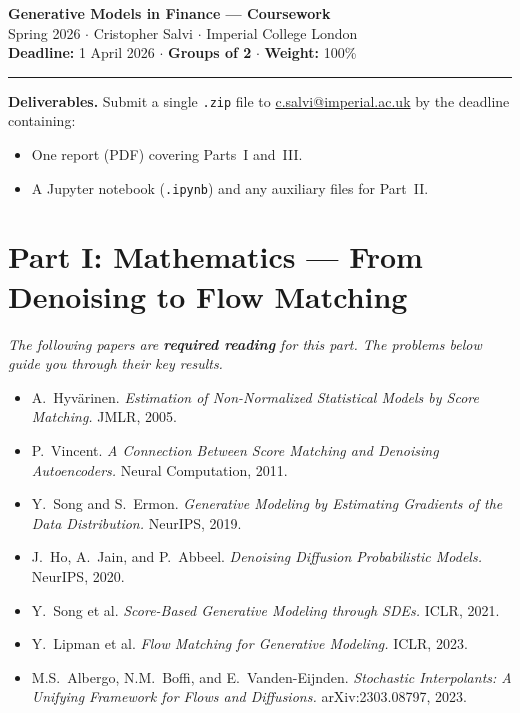 \documentclass[11pt]{article}
\theoremstyle{definition}
\theoremstyle{remark}
\begin{document}
\begin{center}
{\Large \textbf{Generative Models in Finance --- Coursework}} \\[0.3em]
{\normalsize Spring 2026 \quad $\cdot$ \quad Cristopher Salvi \quad $\cdot$ \quad Imperial College London} \\[0.3em]
{\normalsize \textbf{Deadline:} 1 April 2026 \quad $\cdot$ \quad \textbf{Groups of 2} \quad $\cdot$ \quad \textbf{Weight:} 100\%}
\end{center}

\vspace{-0.3em}
\hrule
\vspace{0.6em}

\textbf{Deliverables.} Submit a single \texttt{.zip} file to \href{mailto:c.salvi@imperial.ac.uk}{c.salvi@imperial.ac.uk} by the deadline containing:
\begin{itemize}
\item One report (PDF) covering Parts~I and~III.
\item A Jupyter notebook (\texttt{.ipynb}) and any auxiliary files for Part~II.
\end{itemize}

\section*{Part I: Mathematics --- From Denoising to Flow Matching}

\textit{The following papers are \textbf{required reading} for this part. The problems below guide you through their key results.}

\begin{itemize}
\item[\textbf{[H]}] A.\ Hyv\"arinen. \textit{Estimation of Non-Normalized Statistical Models by Score Matching.} JMLR, 2005.
\item[\textbf{[V]}] P.\ Vincent. \textit{A Connection Between Score Matching and Denoising Autoencoders.} Neural Computation, 2011.
\item[\textbf{[SE]}] Y.\ Song and S.\ Ermon. \textit{Generative Modeling by Estimating Gradients of the Data Distribution.} NeurIPS, 2019.
\item[\textbf{[Ho]}] J.\ Ho, A.\ Jain, and P.\ Abbeel. \textit{Denoising Diffusion Probabilistic Models.} NeurIPS, 2020.
\item[\textbf{[S+]}] Y.\ Song et al. \textit{Score-Based Generative Modeling through SDEs.} ICLR, 2021.
\item[\textbf{[L+]}] Y.\ Lipman et al. \textit{Flow Matching for Generative Modeling.} ICLR, 2023.
\item[\textbf{[A+]}] M.S.\ Albergo, N.M.\ Boffi, and E.\ Vanden-Eijnden. \textit{Stochastic Interpolants: A Unifying Framework for Flows and Diffusions.} arXiv:2303.08797, 2023.
\end{itemize}
\end{document}
